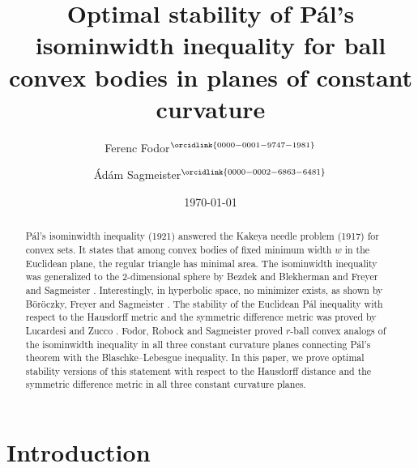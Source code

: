 \documentclass[12pt,reqno]{amsart}
\title[Stability of the ball convex P\'al inequality]{Optimal stability of P\'al's isominwidth inequality for ball convex bodies in planes of constant curvature}
\author[F. Fodor]{Ferenc Fodor$^{\orcidlink{0000-0001-9747-1981}}$}
\author[\'A. Sagmeister]{Ádám Sagmeister$^{\orcidlink{0000-0002-6863-6481}}$}
\date{\today}
\theoremstyle{remark}
\begin{document}
\begin{abstract}
    P\'al's isominwidth inequality (1921) answered the Kakeya needle problem (1917) for convex sets. It states that among convex bodies of fixed minimum width $w$ in the Euclidean plane, the regular triangle has minimal area. The isominwidth inequality was generalized to the $2$-dimensional sphere by Bezdek and Blekherman \cite{Bez00} and Freyer and Sagmeister \cite{FS}. Interestingly, in hyperbolic space, no minimizer exists, as shown by B\"or\"oczky, Freyer and Sagmeister \cite{BoFS}. The stability of the Euclidean Pál inequality with respect to the Hausdorff metric and the symmetric difference metric was proved by Lucardesi and Zucco \cite{LZ24}. Fodor, Robock and Sagmeister \cite{FRS26} proved  $r$-ball convex analogs of the isominwidth inequality in all three constant curvature planes connecting Pál's theorem with the Blaschke--Lebesgue inequality. In this paper, we prove optimal stability versions of this statement with respect to the Hausdorff distance and the symmetric difference metric in all three constant curvature planes. 
\end{abstract}

\maketitle

\section{Introduction}
\label{sec:intro}
\end{document}
